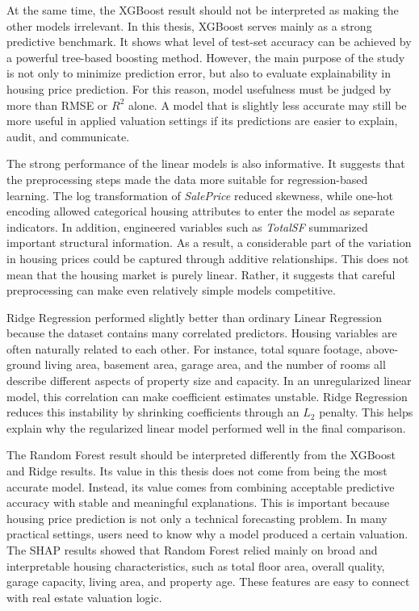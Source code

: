 \documentclass[12pt,a4paper,oneside,openany]{book}
\begin{document}
At the same time, the XGBoost result should not be interpreted as making the other models irrelevant. In this thesis, XGBoost serves mainly as a strong predictive benchmark. It shows what level of test-set accuracy can be achieved by a powerful tree-based boosting method. However, the main purpose of the study is not only to minimize prediction error, but also to evaluate explainability in housing price prediction. For this reason, model usefulness must be judged by more than RMSE or $R^2$ alone. A model that is slightly less accurate may still be more useful in applied valuation settings if its predictions are easier to explain, audit, and communicate.

The strong performance of the linear models is also informative. It suggests that the preprocessing steps made the data more suitable for regression-based learning. The log transformation of \textit{SalePrice} reduced skewness, while one-hot encoding allowed categorical housing attributes to enter the model as separate indicators. In addition, engineered variables such as \textit{TotalSF} summarized important structural information. As a result, a considerable part of the variation in housing prices could be captured through additive relationships. This does not mean that the housing market is purely linear. Rather, it suggests that careful preprocessing can make even relatively simple models competitive.

Ridge Regression performed slightly better than ordinary Linear Regression because the dataset contains many correlated predictors. Housing variables are often naturally related to each other. For instance, total square footage, above-ground living area, basement area, garage area, and the number of rooms all describe different aspects of property size and capacity. In an unregularized linear model, this correlation can make coefficient estimates unstable. Ridge Regression reduces this instability by shrinking coefficients through an $L_2$ penalty. This helps explain why the regularized linear model performed well in the final comparison.

The Random Forest result should be interpreted differently from the XGBoost and Ridge results. Its value in this thesis does not come from being the most accurate model. Instead, its value comes from combining acceptable predictive accuracy with stable and meaningful explanations. This is important because housing price prediction is not only a technical forecasting problem. In many practical settings, users need to know why a model produced a certain valuation. The SHAP results showed that Random Forest relied mainly on broad and interpretable housing characteristics, such as total floor area, overall quality, garage capacity, living area, and property age. These features are easy to connect with real estate valuation logic.
\end{document}
